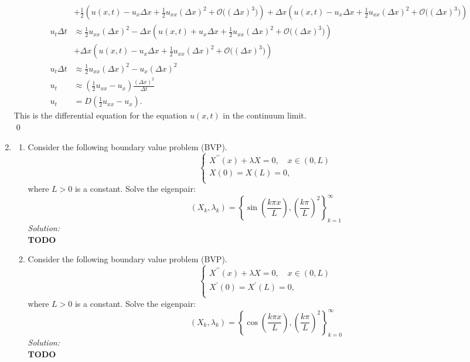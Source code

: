 \documentclass[10pt]{amsart}
\theoremstyle{nonumberplain}
\begin{document}
\begin{enumerate}[label={\bf {\arabic*}:}]
\begin{align*}
	& + \frac 1 2 \left( u(x, t) - u_x \Delta x + \frac 1 2 u_{xx} (\Delta x)^2 + \mathcal O\big((\Delta x)^3\big) \right) + \Delta x \left( u(x, t) - u_x \Delta x + \frac 1 2 u_{xx} (\Delta x)^2 + \mathcal O\big((\Delta x)^3\big) \right) \\
u_t \Delta t &\approx \frac 1 2 u_{xx} (\Delta x)^2 - \Delta x \left( u(x, t) + u_x \Delta x + \frac 1 2 u_{xx} (\Delta x)^2 + \mathcal O\big((\Delta x)^3\big)\right) \\
	& + \Delta x \left( u(x, t) - u_x \Delta x + \frac 1 2 u_{xx} (\Delta x)^2 + \mathcal O\big((\Delta x)^3\big) \right) \\
u_t \Delta t &\approx \frac 1 2 u_{xx} (\Delta x)^2 - u_x (\Delta x)^2 \\
u_t &\approx \left( \frac 1 2 u_{xx} - u_x \right) \frac {(\Delta x)^2}{\Delta t} \\
u_t &= D \left( \frac 1 2 u_{xx} - u_x \right).
\end{align*}
This is the differential equation for the equation $u(x, t)$ in the continuum limit. \\
\qed \\

\newpage

\item 
\begin{enumerate}
\item Consider the following boundary value problem (BVP). \\
$$
\begin{cases}
X^{\prime\prime}(x) + \lambda X = 0, \quad x \in (0, L) \\
X(0)  = X(L) = 0, \\
\end{cases}
$$
where $L > 0$ is a constant.
Solve the eigenpair:
$$
(X_k, \lambda_k) = \left\{ \sin \left( \frac {k \pi x}{L} \right), \left(\frac {k \pi}{L} \right)^2 \right\}_{k=1}^\infty
$$
\textit{Solution:} \\
\textbf{TODO} \\

\item Consider the following boundary value problem (BVP). \\
$$
\begin{cases}
X^{\prime\prime}(x) + \lambda X = 0, \quad x \in (0, L) \\
X^\prime(0)  = X^\prime(L) = 0, \\
\end{cases}
$$
where $L > 0$ is a constant.
Solve the eigenpair:
$$
(X_k, \lambda_k) = \left\{ \cos \left( \frac {k \pi x}{L} \right), \left(\frac {k \pi}{L} \right)^2 \right\}_{k=0}^\infty
$$
\textit{Solution:} \\
\textbf{TODO} \\


\end{enumerate}
\end{enumerate}
\end{document}
